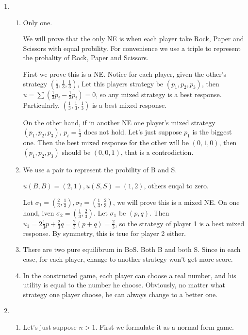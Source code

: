 \documentclass[12pt]{cgtmd}
\begin{document}

\begin{enumerate}
    \item 
        \begin{enumerate}
            \item Only one. 

                We will prove that the only NE is when each player take Rock, Paper and Scissors with equal probility. For convenience we use a triple to represent the probality of Rock, Paper and Scissors.

                First we prove this is a NE. Notice for each player, given the other's strategy $(\frac{1}{3}, \frac{1}{3}, \frac{1}{3})$, Let this players strategy be $(p_1, p_2, p_3)$, then $u = \sum(\frac{1}{3}p_i - \frac{1}{3}p_i) = 0$, so any mixed strategy is a best response. Particularly, $(\frac{1}{3}, \frac{1}{3}, \frac{1}{3})$ is a best mixed response.

                On the other hand, if in another NE one player's mixed strategy $(p_1, p_2, p_3)$, $p_i = \frac{1}{3}$ does not hold. Let's just suppose $p_1$ is the biggest one. Then the best mixed response for the other will be $(0, 1, 0)$, then $(p_1, p_2, p_3)$ should be $(0, 0, 1)$, that is a controdiction.
            \item We use a pair to represent the probility of B and S. 

                $u(B, B) = (2, 1), u(S, S) = (1, 2)$, others euqal to zero.

                Let $\sigma_1 = (\frac{2}{3}, \frac{1}{3}), \sigma_2 = (\frac{1}{3}, \frac{2}{3})$, we will prove this is a mixed NE. On one hand, iven $\sigma_2 = (\frac{1}{3}, \frac{2}{3})$. Let $\sigma_1$ be $(p, q)$. Then $u_1 = 2\frac{1}{3}p + \frac{2}{3}q = \frac{2}{3}(p + q) = \frac{2}{3}$, so  the strategy of player 1 is a best mixed response. By symmetry, this is true for player 2 either.
            \item There are two pure equilibrum in BoS. Both B and both S. Since in each case, for each player, change to another strategy won't get more score.
            \item In the constructed game, each player can choose a real number, and his utility is equal to the number he choose. Obviously, no matter what strategy one player choose, he can always change to a better one.
        \end{enumerate}
    \item
        \begin{enumerate}
            \item Let's just suppose $n > 1$.
                First we formulate it as a normal form game.


\end{enumerate}
\end{enumerate}
\end{document}
